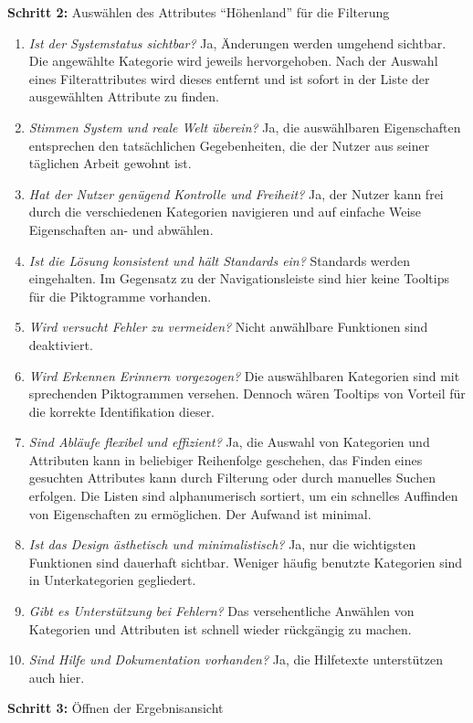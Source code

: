 \textbf{Schritt 2:} Auswählen des Attributes \enquote{Höhenland} für die Filterung
\begin{enumerate}
 \item \textit{Ist der Systemstatus sichtbar?} Ja, Änderungen werden umgehend sichtbar. Die angewählte Kategorie wird jeweils hervorgehoben. Nach der Auswahl eines Filterattributes wird dieses entfernt und ist sofort in der Liste der ausgewählten Attribute zu finden.
 \item \textit{Stimmen System und reale Welt überein?} Ja, die auswählbaren Eigenschaften entsprechen den tatsächlichen Gegebenheiten, die der Nutzer aus seiner täglichen Arbeit gewohnt ist.
 \item \textit{Hat der Nutzer genügend Kontrolle und Freiheit?} Ja, der Nutzer kann frei durch die verschiedenen Kategorien navigieren und auf einfache Weise Eigenschaften an- und abwählen.
 \item \textit{Ist die Lösung konsistent und hält Standards ein?} Standards werden eingehalten. Im Gegensatz zu der Navigationsleiste sind hier keine Tooltips für die Piktogramme vorhanden.
 \item \textit{Wird versucht Fehler zu vermeiden?} Nicht anwählbare Funktionen sind deaktiviert.
 \item \textit{Wird Erkennen Erinnern vorgezogen?} Die auswählbaren Kategorien sind mit sprechenden Piktogrammen versehen. Dennoch wären Tooltips von Vorteil für die korrekte Identifikation dieser.
 \item \textit{Sind Abläufe flexibel und effizient?} Ja, die Auswahl von Kategorien und Attributen kann in beliebiger Reihenfolge geschehen, das Finden eines gesuchten Attributes kann durch Filterung oder durch manuelles Suchen erfolgen. Die Listen sind alphanumerisch sortiert, um ein schnelles Auffinden von Eigenschaften zu ermöglichen. Der Aufwand ist minimal.
 \item \textit{Ist das Design ästhetisch und minimalistisch?} Ja, nur die wichtigsten Funktionen sind dauerhaft sichtbar. Weniger häufig benutzte Kategorien sind in Unterkategorien gegliedert.
 \item \textit{Gibt es Unterstützung bei Fehlern?} Das versehentliche Anwählen von Kategorien und Attributen ist schnell wieder rückgängig zu machen.
 \item \textit{Sind Hilfe und Dokumentation vorhanden?} Ja, die Hilfetexte unterstützen auch hier.
\end{enumerate}
\textbf{Schritt 3:} Öffnen der Ergebnisansicht
